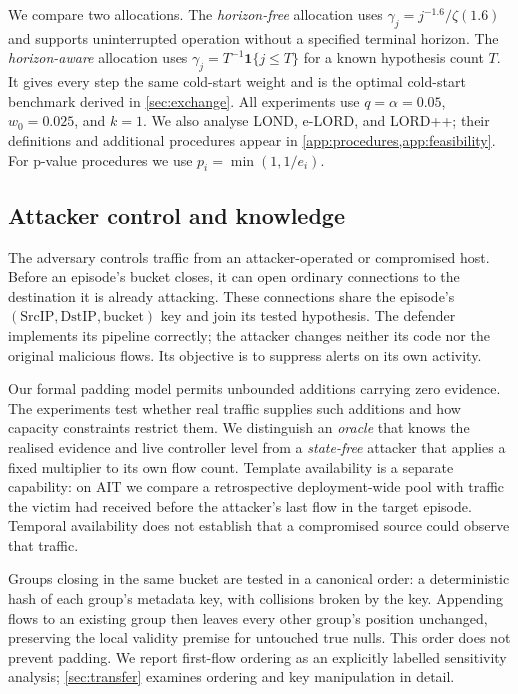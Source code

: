 \documentclass[conference]{IEEEtran}
\begin{document}
We compare two allocations. The \emph{horizon-free} allocation uses
$\gamma_j=j^{-1.6}/\zeta(1.6)$ and supports uninterrupted operation without a specified terminal
horizon. The \emph{horizon-aware} allocation uses
$\gamma_j=T^{-1}\mathbf 1\{j\le T\}$ for a known hypothesis count $T$. It gives every step the same
cold-start weight and is the optimal cold-start benchmark derived in \cref{sec:exchange}.
All experiments use $q=\alpha=0.05$, $w_0=0.025$, and $k=1$. We also analyse LOND, e-LORD, and LORD++;
their definitions and additional procedures appear in \cref{app:procedures,app:feasibility}.
For p-value procedures we use $p_i=\min(1,1/e_i)$.

\subsection{Attacker control and knowledge}\label{sec:threat}

The adversary controls traffic from an attacker-operated or compromised host. Before an episode's
bucket closes, it can open ordinary connections to the destination it is already attacking. These
connections share the episode's $(\mathrm{SrcIP},\mathrm{DstIP},\text{bucket})$ key and join its
tested hypothesis. The defender implements its pipeline correctly; the attacker changes neither its
code nor the original malicious flows. Its objective is to suppress alerts on its own activity.

Our formal padding model permits unbounded additions carrying zero evidence. The experiments test
whether real traffic supplies such additions and how capacity constraints restrict them. We
distinguish an \emph{oracle} that knows the realised evidence and live controller level from a
\emph{state-free} attacker that applies a fixed multiplier to its own flow count. Template
availability is a separate capability: on AIT we compare a retrospective deployment-wide pool with
traffic the victim had received before the attacker's last flow in the target episode. Temporal
availability does not establish that a compromised source could observe that traffic.

Groups closing in the same bucket are tested in a canonical order: a deterministic hash of each
group's metadata key, with collisions broken by the key. Appending flows to an existing group then
leaves every other group's position unchanged, preserving the local validity premise for untouched
true nulls. This order does not prevent padding. We report first-flow ordering as an explicitly
labelled sensitivity analysis; \cref{sec:transfer} examines ordering and key manipulation in detail.
\end{document}
